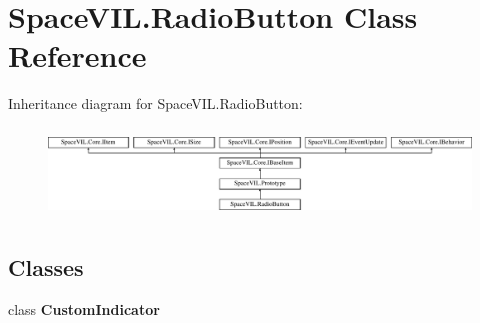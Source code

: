 \hypertarget{class_space_v_i_l_1_1_radio_button}{}\section{Space\+V\+I\+L.\+Radio\+Button Class Reference}
\label{class_space_v_i_l_1_1_radio_button}
Inheritance diagram for Space\+V\+I\+L.\+Radio\+Button\+:\begin{figure}[H]
\begin{center}
\leavevmode
\includegraphics[height=2.421622cm]{class_space_v_i_l_1_1_radio_button}
\end{center}
\end{figure}
\subsection*{Classes}
\begin{DoxyCompactItemize}
\item 
class {\bfseries Custom\+Indicator}
\end{DoxyCompactItemize}
